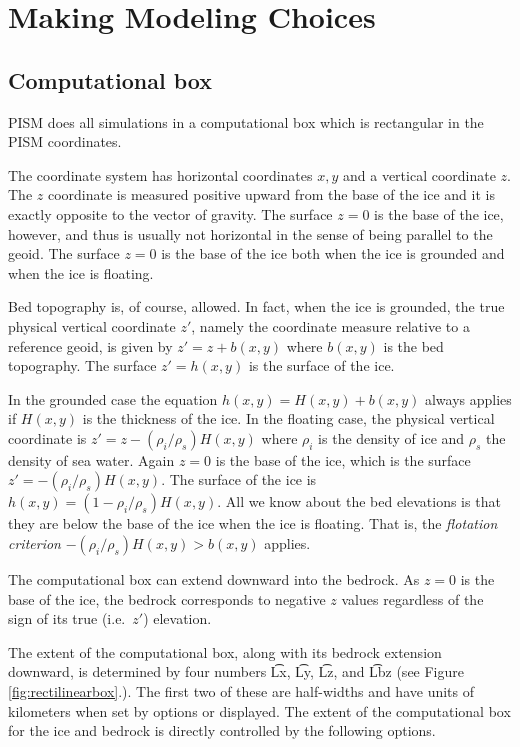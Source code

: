 
\section{Making Modeling Choices}
\label{sec:modeling-choices}

\subsection{Computational box} \label{subsect:coords}

PISM does all simulations in a computational box which is rectangular in the PISM coordinates.

The coordinate system has horizontal coordinates $x,y$ and a vertical coordinate $z$.  The $z$ coordinate is measured positive upward from the base of the ice and it is exactly opposite to the vector of gravity.  The surface $z=0$ is the base of the ice, however, and thus is usually not horizontal in the sense of being parallel to the geoid.   The surface $z=0$ is the base of the ice both when the ice is grounded and when the ice is floating.

Bed topography is, of course, allowed.  In fact, when the ice is grounded, the true physical vertical coordinate $z'$, namely the coordinate measure relative to a reference geoid, is given by $z'=z+b(x,y)$ where $b(x,y)$ is the bed topography.  The surface $z'=h(x,y)$ is the surface of the ice.

In the grounded case the equation $h(x,y)=H(x,y)+b(x,y)$ always applies if $H(x,y)$ is the thickness of the ice.  In the floating case, the physical vertical coordinate is $z'=z-(\rho_i/\rho_s) H(x,y)$ where $\rho_i$ is the density of ice and $\rho_s$ the density of sea water.  Again $z=0$ is the base of the ice, which is the surface $z' = -(\rho_i/\rho_s) H(x,y)$.  The surface of the ice is $h(x,y) = (1-\rho_i/\rho_s) H(x,y)$.  All we know about the bed elevations is that they are below the base of the ice when the ice is floating.  That is, the \emph{flotation criterion} $-(\rho_i/\rho_s) H(x,y) > b(x,y)$ applies.

The computational box can extend downward into the bedrock.  As $z=0$ is the base of the ice, the bedrock corresponds to negative $z$ values regardless of the sign of its true (i.e.~$z'$) elevation.

The extent of the computational box, along with its bedrock extension downward, is determined by four numbers \t{Lx}, \t{Ly}, \t{Lz}, and \t{Lbz} (see Figure \ref{fig:rectilinearbox}.).  The first two of these are half-widths and have units of kilometers when set by options or displayed.  The extent of the computational box for the ice and bedrock is directly controlled by the following options. 

